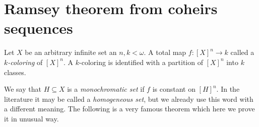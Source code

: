 \documentclass[creche.tex]{subfiles}
\begin{document}



% 



% 



\section{Ramsey theorem from coheirs sequences}
\label{Ramsey}

\def\medrel#1{\parbox[t]{6ex}{$\displaystyle\hfil #1$}}
\def\ceq#1#2#3{\parbox[t]{9ex}{$\displaystyle #1$}\medrel{#2}{$\displaystyle #3$}}


Let $X$ be an arbitrary infinite set an $n,k<\omega$.
A total map $f:[X]^n\to k$ called a \emph{$k$-coloring\/} of $[X]^n$.
A $k$-coloring is identified with a partition of $[X]^n$ into $k$ classes.


We say that $H\subseteq X$ is a \emph{monochromatic set\/} if $f$ is constant on $[H]^n$.
In the literature it may be called a \emph{homogeneous set}, but we already use this word with a different meaning.
The following is a very famous theorem which here we prove it in unusual way.
\end{document}
